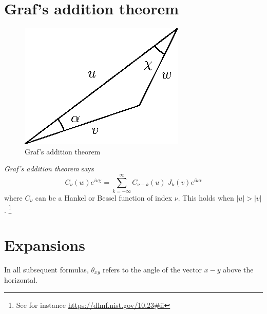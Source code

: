 \documentclass[10pt]{article}
\begin{document}
\section*{Graf's addition theorem}

\begin{figure}[H]
\centering
\includegraphics{media/graf.eps}
\caption{Graf's addition theorem}
\end{figure}

\emph{Graf's addition theorem} says
%
\[ C_\nu(w) e^{i \nu \chi} = \sum_{k = -\infty}^{\infty} C_{\nu + k}(u) \;
J_k(v) e^{i k \alpha} \]
%
where $C_\nu$ can be a Hankel or Bessel function of index $\nu$. This holds when
$|u| > |v|$. \footnote{See for instance \url{https://dlmf.nist.gov/10.23\#ii}}

\section*{Expansions}

In all subsequent formulas, $\theta_{xy}$ refers to the angle of the vector
$x-y$ above the horizontal.
\end{document}
